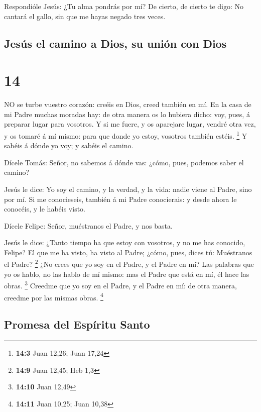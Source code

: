  Respondióle Jesús: ¿Tu alma pondrás por mí? De cierto, de
cierto te digo: No cantará el gallo, sin que me hayas negado tres veces.

\hypertarget{jesuxfas-el-camino-a-dios-su-uniuxf3n-con-dios}{%
\subsection{Jesús el camino a Dios, su unión con
Dios}\label{jesuxfas-el-camino-a-dios-su-uniuxf3n-con-dios}}

\hypertarget{section-13}{%
\section{14}\label{section-13}}

 NO se turbe vuestro corazón: creéis en Dios, creed también
en mí.  En la casa de mi Padre muchas moradas hay: de otra
manera os lo hubiera dicho: voy, pues, á preparar lugar para vosotros.
 Y si me fuere, y os aparejare lugar, vendré otra vez, y os
tomaré á mí mismo: para que donde yo estoy, vosotros también estéis.
\footnote{\textbf{14:3} Juan 12,26; Juan 17,24}  Y sabéis á
dónde yo voy; y sabéis el camino.

 Dícele Tomás: Señor, no sabemos á dónde vas: ¿cómo, pues,
podemos saber el camino?

 Jesús le dice: Yo soy el camino, y la verdad, y la vida:
nadie viene al Padre, sino por mí.  Si me conocieseis,
también á mi Padre conocierais: y desde ahora le conocéis, y le habéis
visto.

 Dícele Felipe: Señor, muéstranos el Padre, y nos basta.

 Jesús le dice: ¿Tanto tiempo ha que estoy con vosotros, y
no me has conocido, Felipe? El que me ha visto, ha visto al Padre;
¿cómo, pues, dices tú: Muéstranos el Padre? \footnote{\textbf{14:9} Juan
  12,45; Heb 1,3}  ¿No crees que yo soy en el Padre, y el
Padre en mí? Las palabras que yo os hablo, no las hablo de mí mismo: mas
el Padre que está en mí, él hace las obras. \footnote{\textbf{14:10}
  Juan 12,49}  Creedme que yo soy en el Padre, y el Padre
en mí: de otra manera, creedme por las mismas obras. \footnote{\textbf{14:11}
  Juan 10,25; Juan 10,38}

\hypertarget{promesa-del-espuxedritu-santo}{%
\subsection{Promesa del Espíritu
Santo}\label{promesa-del-espuxedritu-santo}}

